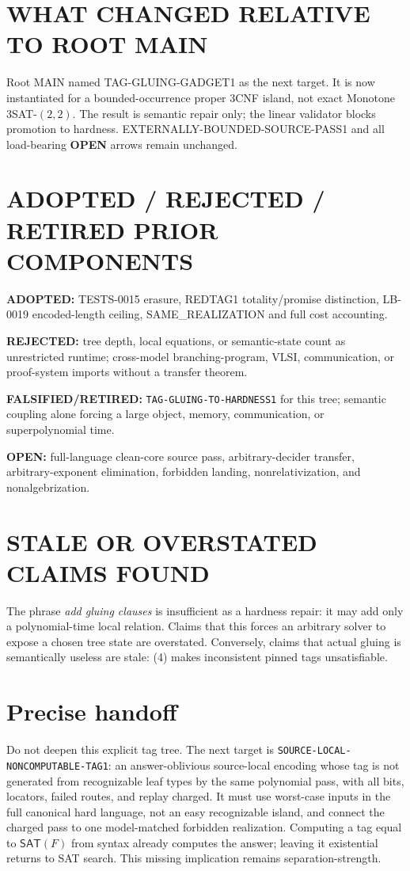 \documentclass[11pt]{article}
\newcommand{\SAT}{\mathsf{SAT}}
\newcommand{\OPEN}{\textbf{OPEN}}
\begin{document}
\section{WHAT CHANGED RELATIVE TO ROOT MAIN}

Root MAIN named TAG-GLUING-GADGET1 as the next target.  It is now instantiated
for a bounded-occurrence proper 3CNF island, not exact Monotone
3SAT-\((2,2)\).  The result is semantic repair only; the linear validator
blocks promotion to hardness.  EXTERNALLY-BOUNDED-SOURCE-PASS1 and all
load-bearing \OPEN{} arrows remain unchanged.

\section{ADOPTED / REJECTED / RETIRED PRIOR COMPONENTS}

\textbf{ADOPTED:} TESTS-0015 erasure, REDTAG1 totality/promise distinction,
LB-0019 encoded-length ceiling, SAME\_REALIZATION and full cost accounting.

\textbf{REJECTED:} tree depth, local equations, or semantic-state count as
unrestricted runtime; cross-model branching-program, VLSI, communication, or
proof-system imports without a transfer theorem.

\textbf{FALSIFIED/RETIRED:} \texttt{TAG-GLUING-TO-HARDNESS1} for this tree;
semantic coupling alone forcing a large object, memory, communication, or
superpolynomial time.

\textbf{OPEN:} full-language clean-core source pass, arbitrary-decider
transfer, arbitrary-exponent elimination, forbidden landing,
nonrelativization, and nonalgebrization.

\section{STALE OR OVERSTATED CLAIMS FOUND}

The phrase \emph{add gluing clauses} is insufficient as a hardness repair:
it may add only a polynomial-time local relation.  Claims that this forces an
arbitrary solver to expose a chosen tree state are overstated.  Conversely,
claims that actual gluing is semantically useless are stale: (4) makes
inconsistent pinned tags unsatisfiable.

\section{Precise handoff}

Do not deepen this explicit tag tree.  The next target is
\texttt{SOURCE-LOCAL-NONCOMPUTABLE-TAG1}: an answer-oblivious source-local
encoding whose tag is not generated from recognizable leaf types by the same
polynomial pass, with all bits, locators, failed routes, and replay charged.
It must use worst-case inputs in the full canonical hard language, not an
easy recognizable island, and connect the charged pass to one model-matched
forbidden realization.  Computing a tag equal to \(\SAT(F)\) from syntax
already computes the answer; leaving it existential returns to SAT search.
This missing implication remains separation-strength.
\end{document}
